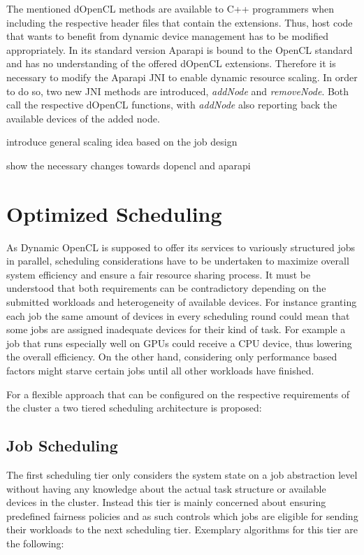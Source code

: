 The mentioned dOpenCL methods are available to C++ programmers when including the respective header files that contain the extensions. Thus, host code that wants to benefit from dynamic device management has to be modified appropriately. In its standard version Aparapi is bound to the OpenCL standard and has no understanding of the offered dOpenCL extensions. Therefore it is necessary to modify the Aparapi JNI to enable dynamic resource scaling. In order to do so, two new JNI methods are introduced, \textit{addNode} and \textit{removeNode}. Both call the respective dOpenCL functions, with \textit{addNode} also reporting back the available devices of the added node.

introduce general scaling idea based on the job design

show the necessary changes towards dopencl and aparapi

\section{Optimized Scheduling}

As Dynamic OpenCL is supposed to offer its services to variously structured jobs in parallel, scheduling considerations have to be undertaken to maximize overall system efficiency and ensure a fair resource sharing process. It must be understood that both requirements can be contradictory depending on the submitted workloads and heterogeneity of available devices. For instance granting each job the same amount of devices in every scheduling round could mean that some jobs are assigned inadequate devices for their kind of task. For example a job that runs especially well on GPUs could receive a CPU device, thus lowering the overall efficiency. On the other hand, considering only performance based factors might starve certain jobs until all other workloads have finished.

For a flexible approach that can be configured on the respective requirements of the cluster a two tiered scheduling architecture is proposed:

\subsection*{Job Scheduling}
The first scheduling tier only considers the system state on a job abstraction level without having any knowledge about the actual task structure or available devices in the cluster. Instead this tier is mainly concerned about ensuring predefined fairness policies and as such controls which jobs are eligible for sending their workloads to the next scheduling tier. Exemplary algorithms for this tier are the following:

